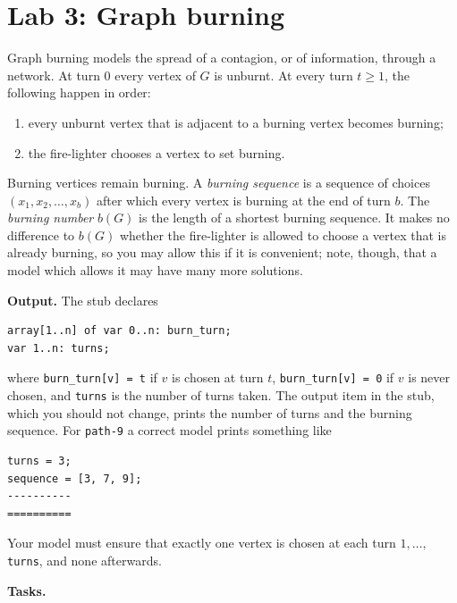 \documentclass[11pt]{article}
\begin{document}
\section*{Lab 3: Graph burning}

Graph burning models the spread of a contagion, or of information, through a network. At turn $0$ every vertex of $G$ is unburnt. At every turn $t \ge 1$, the following happen in order:

\begin{enumerate}
\item every unburnt vertex that is adjacent to a burning vertex becomes burning;
\item the fire-lighter chooses a vertex to set burning.
\end{enumerate}
Burning vertices remain burning. A \emph{burning sequence} is a sequence of choices $(x_1, x_2, \dots, x_b)$ after which every vertex is burning at the end of turn $b$. The \emph{burning number} $b(G)$ is the length of a shortest burning sequence. It makes no difference to $b(G)$ whether the fire-lighter is allowed to choose a vertex that is already burning, so you may allow this if it is convenient; note, though, that a model which allows it may have many more solutions.

\textbf{Output.} The stub declares

\begin{Verbatim}
array[1..n] of var 0..n: burn_turn;
var 1..n: turns;
\end{Verbatim}
where \mbox{\texttt{burn\_turn[v] = t}} if $v$ is chosen at turn $t$, \mbox{\texttt{burn\_turn[v] = 0}} if $v$ is never chosen, and \mbox{\texttt{turns}} is the number of turns taken. The output item in the stub, which you should not change, prints the number of turns and the burning sequence. For \mbox{\texttt{path-{}9}} a correct model prints something like

\begin{Verbatim}
turns = 3;
sequence = [3, 7, 9];
----------
==========
\end{Verbatim}
Your model must ensure that exactly one vertex is chosen at each turn $1, \dots,$ \mbox{\texttt{turns}}, and none afterwards.

\textbf{Tasks.}
\end{document}
